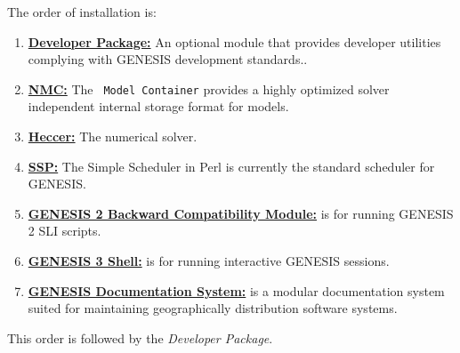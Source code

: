 \documentclass[12pt]{article}
\begin{document}
The order of installation is:
\begin{enumerate}
\item \href{../developer-package/developer-package.tex}{\bf Developer
    Package:} An optional module that provides developer utilities
  complying with GENESIS development standards..
\item \href{../model-container/model-container.tex}{\bf NMC:} The {\tt
    Model Container} provides a highly optimized solver independent
  internal storage format for models.
\item \href{../heccer/heccer.tex}{\bf Heccer:} The numerical solver.
\item \href{../ssp/ssp.tex}{\bf SSP:} The Simple Scheduler in Perl is
  currently the standard scheduler for GENESIS.
\item \href{../backward-compatibility/backward-compatibility.tex}{\bf
    GENESIS 2 Backward Compatibility Module:} is for running GENESIS 2
  SLI scripts.
\item \href{../gshell/gshell.tex}{\bf GENESIS 3 Shell:} is for running
  interactive GENESIS sessions.
\item \href{../documentation-overview/documentation-overview.tex}{\bf
    GENESIS Documentation System:} is a modular documentation system
  suited for maintaining geographically distribution software systems.
\end{enumerate} 

This order is followed by the {\it Developer Package}.



\end{document}
